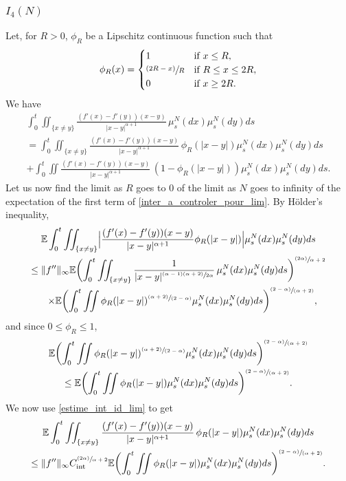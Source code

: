 \documentclass[10pt]{amsart}
\newcommand{\psfrac}[2]{\sfrac{(#1)}{#2}}
\newcommand{\pspfrac}[2]{\sfrac{(#1)}{(#2)}}
\newcommand{\rint}{\mathrm{int}}
\theoremstyle{plain}
\theoremstyle{definition}
\begin{document}
\subsubsection*{$I_4(N)$} Let, for $R>0$, $\phi_R$ be a Lipschitz continuous function such that
\begin{align*}
\phi_R(x)=\begin{cases}
1&\text{if }x\leq R,\\\psfrac{2R-x}{R}&\text{if }R\leq x\leq 2R,\\
0&\text{if }x\geq 2R. \end{cases}
\end{align*}
We have
\begin{multline}\label{inter_a_controler_pour_lim}
\int_{0}^t\iint_{\{x\neq y\}}\frac{(f'(x)-f'(y))(x-y)}{|x-y|^{\alpha+1}}\,\mu^N_s(dx)\mu^N_s(dy)ds\\
=\int_{0}^t\iint_{\{x\neq y\}}\frac{(f'(x)-f'(y))(x-y)}{|x-y|^{\alpha+1}}\,\phi_R(|x-y|)\mu^N_s(dx)\mu^N_s(dy)ds\\
+\int_{0}^t\iint\frac{(f'(x)-f'(y))(x-y)}{|x-y|^{\alpha+1}}\,(1-\phi_R(|x-y|))\mu^N_s(dx)\mu^N_s(dy)ds.
\end{multline}
Let us now find the limit as $R$ goes to 0 of the limit as $N$ goes to infinity of the expectation of the first term of \eqref{inter_a_controler_pour_lim}. By Hölder's inequality,
\begin{multline*}
\mathbb{E}\int_{0}^t\iint_{\{x\neq y\}}\Bigl|\frac{(f'(x)-f'(y))(x-y)}{|x-y|^{\alpha+1}}\phi_R(|x-y|)\Bigr|\mu^N_s(dx)\mu^N_s(dy)ds\\
\leq \|f''\|_\infty\mathbb{E}\biggl(\int_{0}^t\iint_{\{x\neq y\}}\frac{1}{|x-y|^{\sfrac{(\alpha-1)(\alpha+2)}{2\alpha}}}\,\mu^N_s(dx)\mu^N_s(dy)ds\biggr)^{\psfrac{2\alpha}{\alpha+2}}\\
\hspace{0.3cm}\times\mathbb{E}\biggl(\int_{0}^t\iint\phi_R(|x-y|)^{\pspfrac{\alpha+2}{2-\alpha}}\mu^N_s(dx)\mu^N_s(dy)ds\biggr)^{\pspfrac{2-\alpha}{\alpha+2}},
\end{multline*}
and since $0\leq\phi_R\leq1$,
\begin{multline*}
\mathbb{E}\biggl(\int_{0}^t\iint\phi_R(|x-y|)^{\pspfrac{\alpha+2}{2-\alpha}}\mu^N_s(dx)\mu^N_s(dy)ds\biggr)^{\pspfrac{2-\alpha}{\alpha+2}}
\\
\leq\mathbb{E}\biggl(\int_{0}^t\iint\phi_R(|x-y|)\mu^N_s(dx)\mu^N_s(dy)ds\biggr)^{\pspfrac{2-\alpha}{\alpha+2}}.
\end{multline*}
We now use \eqref{estime_int_id_lim} to get
\begin{multline}\label{inter_a_controler_pour_lim_1}
\mathbb{E}\int_{0}^t\iint_{\{x\neq y\}}\frac{(f'(x)-f'(y))(x-y)}{|x-y|^{\alpha+1}}\,\phi_R(|x-y|)\mu^N_s(dx)\mu^N_s(dy)ds\\
\leq \|f''\|_\infty C_{\rint}^{\psfrac{2\alpha}{\alpha+2}}\mathbb{E}\biggl(\int_{0}^t\iint\phi_R(|x-y|)\mu^N_s(dx)\mu^N_s(dy)ds\biggr)^{\pspfrac{2-\alpha}{\alpha+2}}.
\end{multline}
\end{document}
